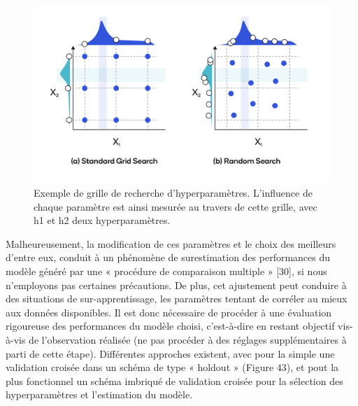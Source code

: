 \begin{figure}[H]
    \centering
    \includegraphics[width=\linewidth]{contents/chapter_3/resources/HyperParameter.png}
    \caption{Exemple de grille de recherche d’hyperparamètres. L’influence de chaque paramètre est ainsi mesurée au travers de cette grille, avec h1 et h2 deux hyperparamètres.}
    \label{fig:chapter_3:HyperParameter}
\end{figure}

Malheureusement, la modification de ces paramètres et le choix des meilleurs d’entre eux, conduit à un phénomène de surestimation des performances du modèle généré par une « procédure de comparaison multiple » [30], si nous n’employons pas certaines précautions. De plus, cet ajustement peut conduire à des situations de sur-apprentissage, les paramètres tentant de corréler au mieux aux données disponibles. Il est donc nécessaire de procéder à une évaluation rigoureuse des performances du modèle choisi, c’est-à-dire en restant objectif vis-à-vis de l’observation réalisée (ne pas procéder à des réglages supplémentaires à parti de cette étape). Différentes approches existent, avec pour la simple une validation croisée dans un schéma de type « holdout » (Figure 43), et pout la plus fonctionnel un schéma imbriqué de validation croisée pour la sélection des hyperparamètres et l’estimation du modèle.
  
